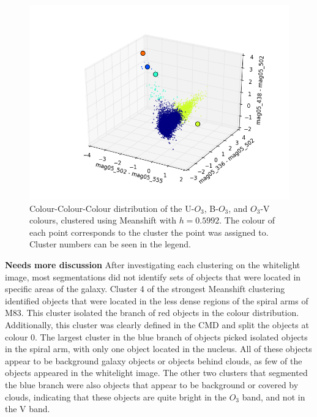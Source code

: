 \begin{figure}
\centering
\includegraphics[width=\linewidth]{figs/meanshift_3d_color_5cl_mag05_502-mag05_555vsmag05_336-mag05_502vsmag05_438-mag05_502}
\caption{Colour-Colour-Colour distribution of the U-$O_{3}$, B-$O_{3}$, and $O_{3}$-V colours, clustered using Meanshift with $h=0.5992$. The colour of each point corresponds to the cluster the point was assigned to. Cluster numbers can be seen in the legend.}
\label{fig:fig:OIIIVMS3d}
\end{figure}

\textbf{Needs more discussion}
After investigating each clustering on the whitelight image, most segmentations did not identify sets of objects that were located in specific areas of the galaxy.
Cluster 4 of the strongest Meanshift clustering identified objects that were located in the less dense regions of the spiral arms of M83.
This cluster isolated the branch of red objects in the colour distribution.
Additionally, this cluster was clearly defined in the CMD and split the objects at colour 0.
The largest cluster in the blue branch of objects picked isolated objects in the spiral arm, with only one object located in the nucleus.
All of these objects appear to be background galaxy objects or objects behind clouds, as few of the objects appeared in the whitelight image.
The other two clusters that segmented the blue branch were also objects that appear to be background or covered by clouds, indicating that these objects are quite bright in the $O_{3}$ band, and not in the V band.

